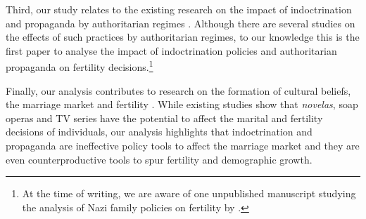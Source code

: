\documentclass[a4paper,oneside,final,onecolumn,11pt,english]{article}
\begin{document}
Third, our study relates to the existing research on the impact of indoctrination and propaganda by authoritarian regimes \citep{waldinger2010quality, waldinger2012peer, adena2015, voigtlander2015, cantoni2017curriculum, homola}. Although there are several studies on the effects of such practices by authoritarian regimes, to our knowledge this is the first paper to analyse the impact of indoctrination policies and authoritarian propaganda on fertility decisions.\footnote{At the time of writing, we are aware of one unpublished manuscript studying the analysis of Nazi family policies on fertility by \citet[][]{baudin2023}.}



Finally, our analysis contributes to research on the formation of cultural beliefs, the marriage market and fertility \citep{chong_laferrara2009, laferrara_etal2012}. While existing studies show that \textit{novelas}, soap operas and TV series have the potential to affect the marital and fertility decisions of individuals, our analysis highlights that indoctrination and propaganda are ineffective policy tools to affect the marriage market and they are even counterproductive tools to spur fertility and demographic growth. 
 


\clearpage
\printbibliography
\end{document}
